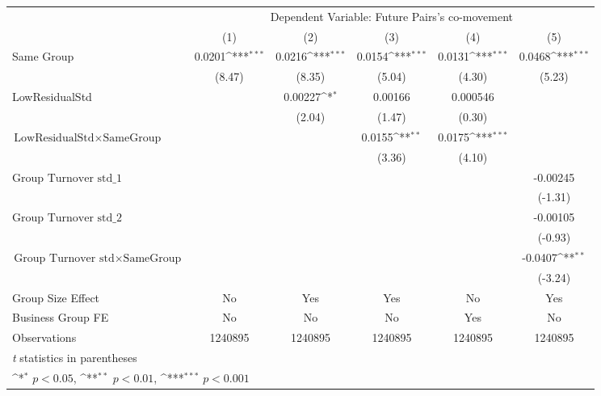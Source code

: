 {
\def\sym#1{\ifmmode^{#1}\else\(^{#1}\)\fi}
\begin{tabular}{l*{5}{c}}
\hline\hline
                &\multicolumn{5}{c}{Dependent Variable:  Future Pairs's co-movement}                           \\\cmidrule(lr){2-6}
                &\multicolumn{1}{c}{(1)}         &\multicolumn{1}{c}{(2)}         &\multicolumn{1}{c}{(3)}         &\multicolumn{1}{c}{(4)}         &\multicolumn{1}{c}{(5)}         \\
\hline
Same Group      &   0.0201\sym{***}&   0.0216\sym{***}&   0.0154\sym{***}&   0.0131\sym{***}&   0.0468\sym{***}\\
                &   (8.47)         &   (8.35)         &   (5.04)         &   (4.30)         &   (5.23)         \\
[1em]
LowResidualStd  &                  &  0.00227\sym{*}  &  0.00166         & 0.000546         &                  \\
                &                  &   (2.04)         &   (1.47)         &   (0.30)         &                  \\
[1em]
$ {\text{LowResidualStd} } \times {\text{SameGroup} }  $ &                  &                  &   0.0155\sym{**} &   0.0175\sym{***}&                  \\
                &                  &                  &   (3.36)         &   (4.10)         &                  \\
[1em]
 $ {\text{Group Turnover std}\_1} $ &                  &                  &                  &                  & -0.00245         \\
                &                  &                  &                  &                  &  (-1.31)         \\
[1em]
 $ {\text{Group Turnover std}\_2} $ &                  &                  &                  &                  & -0.00105         \\
                &                  &                  &                  &                  &  (-0.93)         \\
[1em]
$ {\text{Group Turnover std} } \times {\text{SameGroup} }  $ &                  &                  &                  &                  &  -0.0407\sym{**} \\
                &                  &                  &                  &                  &  (-3.24)         \\
\hline
Group Size Effect&       No         &      Yes         &      Yes         &       No         &      Yes         \\
Business Group FE&       No         &       No         &       No         &      Yes         &       No         \\
Observations    &  1240895         &  1240895         &  1240895         &  1240895         &  1240895         \\
\hline\hline
\multicolumn{6}{l}{\footnotesize \textit{t} statistics in parentheses}\\
\multicolumn{6}{l}{\footnotesize \sym{*} \(p<0.05\), \sym{**} \(p<0.01\), \sym{***} \(p<0.001\)}\\
\end{tabular}
}
